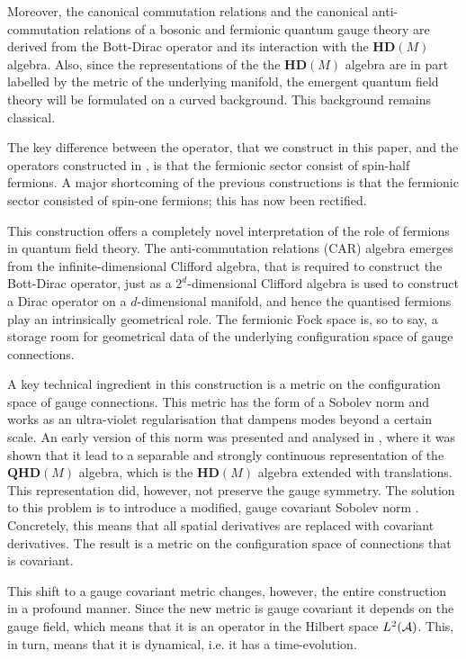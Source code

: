 \documentclass[letterpaper,11pt]{article}
\def\ca{{\cal A}}
\begin{document}
Moreover, the canonical commutation relations and the canonical anti-commutation relations of a bosonic and fermionic quantum gauge theory are derived from the Bott-Dirac operator and its interaction with the $\mathbf{HD}(M)$ algebra. Also, since the representations of the the $\mathbf{HD}(M)$ algebra are in part labelled by the metric of the underlying manifold, the emergent quantum field theory will be formulated on a curved background. This background remains classical. 



The key difference between the operator, that we construct in this paper, and the operators constructed in \cite{Aastrup:2019yui,Aastrup:2017atr}, is that the fermionic sector consist of spin-half fermions. A major shortcoming of the previous constructions is that the fermionic sector consisted of spin-one fermions; this has now been rectified.


This construction offers a completely novel interpretation of the role of fermions in quantum field theory. The anti-commutation relations (CAR) algebra emerges from the infinite-dimensional Clifford algebra, that is required to construct the Bott-Dirac operator, just as a $2^d$-dimensional Clifford algebra is used to construct a Dirac operator on a $d$-dimensional manifold, and hence the quantised fermions play an intrinsically geometrical role. The fermionic Fock space is, so to say, a storage room for geometrical data of the underlying configuration space of gauge connections. 

A key technical ingredient in this construction is a metric on the configuration space of gauge connections. This metric has the form of a Sobolev norm and works as an ultra-violet regularisation that dampens modes beyond a certain scale. An early version of this norm was presented and analysed in \cite{Aastrup:2017vrm}, where it was shown that it lead to a separable and strongly continuous representation of the $\mathbf{QHD}(M)$ algebra, which is the $\mathbf{HD}(M)$ algebra extended with translations. This representation did, however, not preserve the gauge symmetry. The solution to this problem is to introduce a modified, gauge covariant Sobolev norm \cite{Aastrup:2019yui}. Concretely, this means that all spatial derivatives are replaced with covariant derivatives. The result is a metric on the configuration space of connections that is covariant. 

This shift to a gauge covariant metric changes, however, the entire construction in a profound manner. Since the new metric is gauge covariant it depends on the gauge field, which means that it is an operator in the Hilbert space $L^2(\ca)$. This, in turn, means that it is dynamical, i.e. it has a time-evolution.
\end{document}
